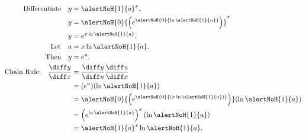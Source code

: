 \begin{frame}
\begin{example}
\abovedisplayskip=0pt
\belowdisplayskip=0pt
\abovedisplayshortskip=0pt
\belowdisplayshortskip=0pt
\begin{align*}
\text{Differentiate}\quad y & = {\alertNoH{1}{a}}^x .\\
y & =  {\alertNoH{0}{ \left( e^{\alertNoH{0}{\ln {\alertNoH{1}{a}}}} \right)}} ^{x} \\
y & = e^{x\ln {\alertNoH{1}{a}}}.\\
\text{Let} \quad u &=  x\ln {\alertNoH{1}{a}}.\\
\text{Then} \quad y &=  e^{u}. \\
\text{Chain Rule:}\quad \frac{\diff y}{\diff x} &= \frac{\diff y}{\diff u}\frac{\diff u}{\diff x}\\
&= ( e^{u})(\ln {\alertNoH{1}{a}})\\
&=\alertNoH{0}{ \left(  e^{\alertNoH{0}{(x\ln \alertNoH{1}{a} )}}\right)} (\ln {\alertNoH{1}{a}})\\
&= \left( e^{\ln {\alertNoH{1}{a}}}\right)^x(\ln {\alertNoH{1}{a}})\\
&= {\alertNoH{1}{a}}^x \ln {\alertNoH{1}{a}}.
\end{align*}
\end{example}
\end{frame}
